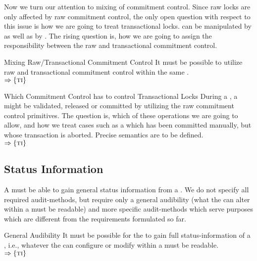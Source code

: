 \documentclass[a4paper, 12pt]{book}
\newcommand{\INTERFACE}[1]{$\Rightarrow\left\{#1\right\}$}
\begin{document}
Now we turn our attention to mixing of commitment control. Since
raw locks are only affected by raw commitment control, the only open
question with respect to this issue is how we are going to treat
transactional locks.  can be manipulated by
 as well as by . The rising question is, how we are going to assign the
responsibility between the raw and transactional commitment control.
%
\begin{requirement*}{Mixing Raw/Transactional Commitment Control}
   It must be possible to utilize raw and transactional commitment
   control within the same .\\
   \INTERFACE{\TRANSACTION}
\end{requirement*}
%
\begin{question*}{Which Commitment Control has to control
   Transactional Locks}
  During a , a  might be
  validated, released or committed by utilizing the raw commitment
  control primitives. The question is, which of these operations we
  are going to allow, and how we treat cases such as a
   which has been committed manually, but whose
  transaction is aborted. Precise semantics are to be defined.\\
  \INTERFACE{\TRANSACTION}
\end{question*}



\subsection{Status Information}


A  must be able to gain general status information from a
. We do not specify all required audit-methods, but require
only a general audibility (what the  can alter within a
 must be readable) and more specific audit-methods which serve
purposes which are different from the requirements formulated so far.

\begin{requirement*}{General Audibility}
  It must be possible for the  to gain full status-information of a
  , i.e., whatever the  can configure or modify
  within a  must be readable.\\
  \INTERFACE{\TRANSACTION}
\end{requirement*}
\end{document}
